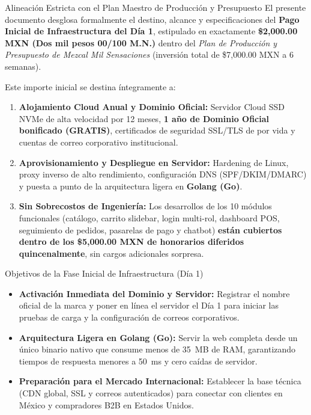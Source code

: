 \documentclass[11pt,letterpaper]{article}
\begin{document}
\begin{resumenbox}{Alineación Estricta con el Plan Maestro de Producción y Presupuesto}
\small
El presente documento desglosa formalmente el destino, alcance y especificaciones del \textbf{Pago Inicial de Infraestructura del Día 1}, estipulado en exactamente \textbf{\$2,000.00 MXN (Dos mil pesos 00/100 M.N.)} dentro del \textit{Plan de Producción y Presupuesto de Mezcal Mil Sensaciones} (inversión total de \$7,000.00 MXN a 6 semanas).

Este importe inicial se destina íntegramente a:
\begin{enumerate}[leftmargin=1.2cm,topsep=2pt,itemsep=3pt]
    \item \textbf{Alojamiento Cloud Anual y Dominio Oficial:} Servidor Cloud SSD NVMe de alta velocidad por 12 meses, \textbf{1 año de Dominio Oficial bonificado (GRATIS)}, certificados de seguridad SSL/TLS de por vida y cuentas de correo corporativo institucional.
    \item \textbf{Aprovisionamiento y Despliegue en Servidor:} Hardening de Linux, proxy inverso de alto rendimiento, configuración DNS (SPF/DKIM/DMARC) y puesta a punto de la arquitectura ligera en \textbf{Golang (Go)}.
    \item \textbf{Sin Sobrecostos de Ingeniería:} Los desarrollos de los 10 módulos funcionales (catálogo, carrito slidebar, login multi-rol, dashboard POS, seguimiento de pedidos, pasarelas de pago y chatbot) \textbf{están cubiertos dentro de los \$5,000.00 MXN de honorarios diferidos quincenalmente}, sin cargos adicionales sorpresa.
\end{enumerate}
\end{resumenbox}

\vspace{0.3cm}

\begin{infobox}{Objetivos de la Fase Inicial de Infraestructura (Día 1)}
\small
\begin{itemize}[leftmargin=1.0cm,topsep=2pt,itemsep=2.5pt]
    \item \textbf{Activación Inmediata del Dominio y Servidor:} Registrar el nombre oficial de la marca y poner en línea el servidor el Día 1 para iniciar las pruebas de carga y la configuración de correos corporativos.
    \item \textbf{Arquitectura Ligera en Golang (Go):} Servir la web completa desde un único binario nativo que consume menos de 35~MB de RAM, garantizando tiempos de respuesta menores a 50~ms y cero caídas de servidor.
    \item \textbf{Preparación para el Mercado Internacional:} Establecer la base técnica (CDN global, SSL y correos autenticados) para conectar con clientes en México y compradores B2B en Estados Unidos.
\end{itemize}
\end{infobox}
\end{document}
